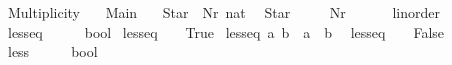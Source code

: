 %
\begin{isabellebody}%
%
%
\isadelimtheory
%
\endisadelimtheory
%
\isatagtheory
{}\isamarkupfalse%
\ Multiplicity\isanewline
\ \ \ Main\isanewline
{}%
\endisatagtheory
{\isafoldtheory}%
%
\isadelimtheory
%
\endisadelimtheory
%
\isadelimdocument
%
\endisadelimdocument
%
\isatagdocument
%
\isamarkuptrue%
%
\endisatagdocument
{\isafolddocument}%
%
\isadelimdocument
%
\endisadelimdocument
{}\isamarkupfalse%
\ {\isasymM}\ {\isacharequal}\ Star\ {\isacharbar}\ Nr\ nat\isanewline
\isanewline
{}\isamarkupfalse%
\isanewline
\ \ Star\ {\isacharparenleft}{\isachardoublequoteopen}{\isacharparenleft}\isactrlemph {\isacharparenright}{\isachardoublequoteclose}\ {}{}{}{}{\isacharparenright}\ \isanewline
\ \ Nr\ {\isacharparenleft}{\isachardoublequoteopen}{\isacharparenleft}\isactrlbold {\isacharunderscore}{\isacharparenright}{\isachardoublequoteclose}\ {\isacharbrackleft}{}{}{}{}{\isacharbrackright}\ {}{}{}{}{\isacharparenright}\isanewline
\isanewline
{}\isamarkupfalse%
\ {\isasymM}\ {\isacharcolon}{\isacharcolon}\ linorder\isanewline
{}\isanewline
\isanewline
{}\isamarkupfalse%
\ less{\isacharunderscore}eq{\isacharunderscore}{\isasymM}\ {\isacharcolon}{\isacharcolon}\ {\isachardoublequoteopen}{\isasymM}\ {\isasymRightarrow}\ {\isasymM}\ {\isasymRightarrow}\ bool{\isachardoublequoteclose}\ \isanewline
{\isachardoublequoteopen}less{\isacharunderscore}eq{\isacharunderscore}{\isasymM}\ {\isacharunderscore}\ \isactrlemph \ {\isacharequal}\ True{\isachardoublequoteclose}\ {\isacharbar}\isanewline
{\isachardoublequoteopen}less{\isacharunderscore}eq{\isacharunderscore}{\isasymM}\ {\isacharparenleft}\isactrlbold a{\isacharparenright}\ {\isacharparenleft}\isactrlbold b{\isacharparenright}\ {\isacharequal}\ {\isacharparenleft}a\ {\isasymle}\ b{\isacharparenright}{\isachardoublequoteclose}\ {\isacharbar}\ \isanewline
{\isachardoublequoteopen}less{\isacharunderscore}eq{\isacharunderscore}{\isasymM}\ {\isacharunderscore}\ {\isacharunderscore}\ {\isacharequal}\ False{\isachardoublequoteclose}\isanewline
\isanewline
{}\isamarkupfalse%
\ less{\isacharunderscore}{\isasymM}\ {\isacharcolon}{\isacharcolon}\ {\isachardoublequoteopen}{\isasymM}\ {\isasymRightarrow}\ {\isasymM}\ {\isasymRightarrow}\ bool{\isachardoublequoteclose}\ \isanewline

\end{isabellebody}
